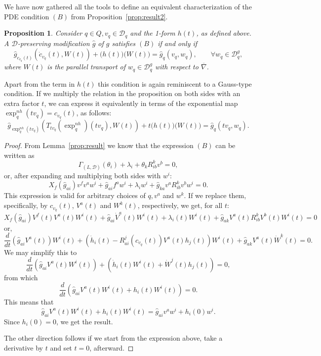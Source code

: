 \documentclass[11pt]{article}
\newtheorem{prop}{Proposition}
\def\D{{\mathcal D}}
\begin{document}
We have now gathered all the tools to define an equivalent characterization of the PDE condition $(B)$ from Proposition~\ref{prop:result2}.

\begin{prop} \label{prop:PT} Consider $q\in Q, v_q\in\mathcal{D}_q$ and the 1-form $h(t)$, as defined above. A $\D$-preserving modification  $\hat{g}$ of $g$ satisfies $(B)$ if and only if  
$$ 
\hat{g}_{c_{v_q}(t)} \left( {\dot c}_{v_q}(t),W(t)\right)+ \Big(h(t)\Big)\Big(W(t)\Big)=\hat{g}_q(v_q,w_q), \qquad \forall  w_q\in\mathcal{D}^g_q,
$$
   where 
	$W(t)$ is the parallel transport of $w_q\in\mathcal{D}^g_q$ with respect to ${\overline\nabla}$.
	\end{prop}

Apart from the term in $h(t)$ this condition is again reminiscent to a Gauss-type condition.
If we multiply the relation in the proposition on both sides with an extra factor $t$, we can  express it equivalently  in terms of the exponential map $\exp^{nh}_q(tv_q)=c_{v_q}(t)$, as follows:
$$ 
\hat{g}_{\exp_q^{nh}(tv_q)}\left(T_{tv_q}(\exp^{nh}_q)(tv_q),W(t)\right)+t \Big(h(t)\Big)\Big(W(t)\Big)=\hat{g}_q(tv_q,w_q).
$$

\begin{proof} 
From Lemma~\ref{prop:result} we know that the expression $(B)$ can be written as 
\[
\Gamma_{(L,\mathcal{D})}(\theta_i)+\lambda_i+\theta_k R^k_{ib}v^b=0,
\]
or, after expanding and multiplying both sides with $w^i$: 
\[
X_f(\hat{g}_{ai})v^f v^a w^i+  {\hat g}_{ai}f^aw^i  +\lambda_i w^i +  \hat{g}_{ka}v^a R^k_{ib}v^b w^i=0.
\]
This expression is valid for arbitrary choices of $q,v^a$ and $w^k$. If we replace them, specifically, by $c_{v_q}(t)$, $V^a(t)$ and $W^k(t)$, respectively, we get, for all $t$:
\[
X_f(\hat{g}_{ai})V^f(t) V^a(t) W^i(t)+  {\hat g}_{ai}{\dot V}^a(t) W^i(t)  +\lambda_i(t) W^i(t) +  \hat{g}_{ak}V^a(t) R^k_{ib}V^b(t) W^i(t)=0
\]
or, 
\[
\frac{d}{dt}\left( \hat{g}_{ai}  V^a(t) \right) W^i(t)+  \left( \dot{h}_i(t)-R^j_{ai}(c_{v_q}(t))V^a(t) h_j(t)   \right) W^i(t) +  \hat{g}_{ak}V^a(t) {\dot W}^k(t)=0.
\]
We may simplify this to
\[
\frac{d}{dt}\left( \hat{g}_{ai}  V^a(t)  W^i(t)\right)+  \left( \dot{h}_i(t) W^i(t)  + {\dot W}^j(t) h_j(t) \right)   =0,
\]
from which
\[
\frac{d}{dt}\left( \hat{g}_{ai}  V^a(t)  W^i(t)+ {h}_i(t) W^i(t) \right)   =0.
\]
This means that 
\[
\hat{g}_{ai}  V^a(t)  W^i(t)+ {h}_i(t) W^i(t)=\hat{g}_{ai}  v^a  w^i + {h}_i(0) w^i.
\]
Since $h_i(0)=0$, we get the result.

The other direction follows if we start from the expression above, take a derivative by $t$ and set $t=0$, afterward.
\end{proof}
\end{document}
